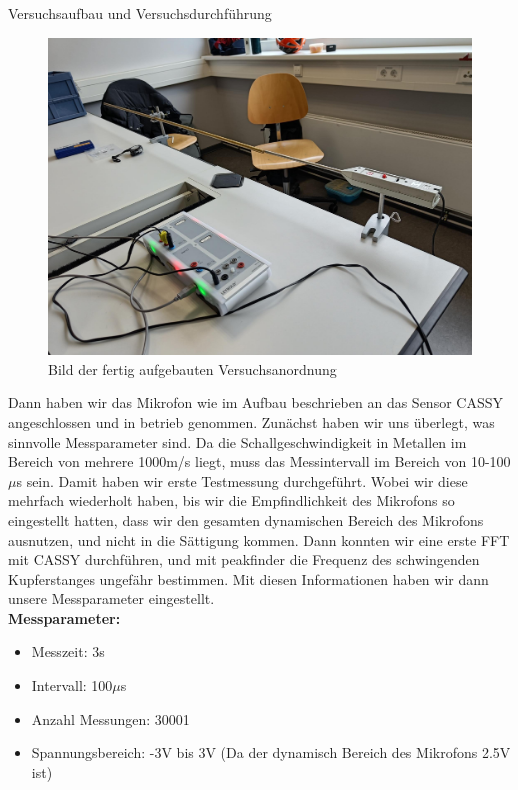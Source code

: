 \documentclass[twoside]{protokoll}
\begin{document}
\begin{aufgabe}{Versuchsaufbau und Versuchsdurchführung}
\begin{figure}[H]
  \centering
  \includegraphics[width=1\textwidth]{Bilder/434170_428396_1A3_Gesamtaufbau.pdf}
  \caption{Bild der fertig aufgebauten Versuchsanordnung}
  \centering
\end{figure}

Dann haben wir das Mikrofon wie im Aufbau beschrieben an das Sensor CASSY angeschlossen und in betrieb genommen. Zunächst haben wir uns überlegt, was sinnvolle Messparameter sind. Da die Schallgeschwindigkeit in Metallen im Bereich von mehrere 1000m/s liegt, muss das Messintervall im Bereich von 10-100$\mu$s sein. Damit haben wir erste Testmessung durchgeführt.
Wobei wir diese mehrfach wiederholt haben, bis wir die Empfindlichkeit des Mikrofons so eingestellt hatten, dass wir den gesamten dynamischen Bereich des Mikrofons ausnutzen, und nicht in die Sättigung kommen.
Dann konnten wir eine erste FFT mit CASSY durchführen, und mit peakfinder die Frequenz des schwingenden Kupferstanges ungefähr bestimmen.
Mit diesen Informationen haben wir dann unsere Messparameter eingestellt.\\

\textbf{Messparameter:}
\begin{itemize}
\item Messzeit: 3s
\item Intervall: 100$\mu$s
\item Anzahl Messungen: 30001
\item Spannungsbereich: -3V bis 3V (Da der dynamisch Bereich des Mikrofons 2.5V ist)
\end{itemize}


\end{aufgabe}
\end{document}
